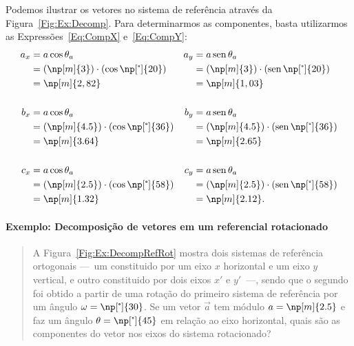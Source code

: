 Podemos ilustrar os vetores no sistema de referência através da Figura~\ref{Fig:Ex:Decomp}. Para determinarmos as componentes, basta utilizarmos as Expressões~\eqref{Eq:CompX} e~\eqref{Eq:CompY}:
\begin{align*}
    a_x &= a\cos\theta_a & a_y &= a\sen\theta_a \\
    &= (\np[m]{3})\cdot(\cos\np[\tcdegree]{20}) & &= (\np[m]{3})\cdot(\sen\np[\tcdegree]{20}) \\
    &= \np[m]{2,82} & &= \np[m]{1,03} \\
    \\
    b_x &= a\cos\theta_a & b_y &= a\sen\theta_a \\
    &= (\np[m]{4.5})\cdot(\cos\np[\tcdegree]{36}) & &= (\np[m]{4.5})\cdot(\sen\np[\tcdegree]{36}) \\
    &= \np[m]{3.64} & &= \np[m]{2.65} \\
    \\
    c_x &= a\cos\theta_a & c_y &= a\sen\theta_a \\
    &= (\np[m]{2.5})\cdot(\cos\np[\tcdegree]{58}) & &= (\np[m]{2.5})\cdot(\sen\np[\tcdegree]{58}) \\
    &= \np[m]{1.32} & &= \np[m]{2.12}.
\end{align*}

\paragraph{Exemplo: Decomposição de vetores em um referencial rotacionado}

\begin{quote}
    A Figura~\ref{Fig:Ex:DecompRefRot} mostra dois sistemas de referência ortogonais ---~um constituido por um eixo $x$ horizontal e um eixo $y$ vertical, e outro constituido por dois eixos $x'$ e $y'$~---, sendo que o segundo foi obtido a partir de uma rotação do primeiro sistema de referência por um ângulo $\omega = \np[\tcdegree]{30}$. Se um vetor $\vec{a}$ tem módulo $a = \np[m]{2.5}$ e faz um ângulo $\theta = \np[\tcdegree]{45}$ em relação ao eixo horizontal, quais são as componentes do vetor nos eixos do sistema rotacionado?
\end{quote}

